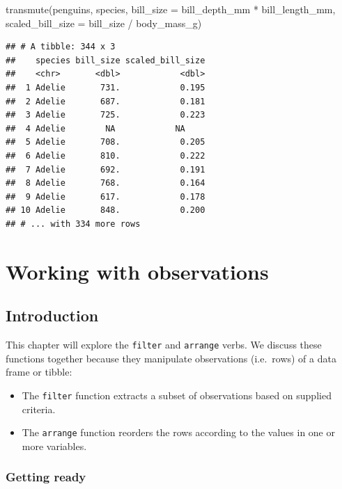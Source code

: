 \documentclass[
]{book}
\newenvironment{Shaded}{\begin{snugshade}}{\end{snugshade}}
\newcommand{\AttributeTok}[1]{\textcolor[rgb]{0.77,0.63,0.00}{#1}}
\newcommand{\FunctionTok}[1]{\textcolor[rgb]{0.00,0.00,0.00}{#1}}
\newcommand{\NormalTok}[1]{#1}
\newcommand{\SpecialCharTok}[1]{\textcolor[rgb]{0.00,0.00,0.00}{#1}}
\providecommand{\tightlist}{%
  \setlength{\itemsep}{0pt}\setlength{\parskip}{0pt}}
\begin{document}
\begin{Shaded}
\begin{Highlighting}[]
\FunctionTok{transmute}\NormalTok{(penguins,}
\NormalTok{          species,}
          \AttributeTok{bill\_size =}\NormalTok{ bill\_depth\_mm }\SpecialCharTok{*}\NormalTok{ bill\_length\_mm,}
          \AttributeTok{scaled\_bill\_size =}\NormalTok{ bill\_size }\SpecialCharTok{/}\NormalTok{ body\_mass\_g)}
\end{Highlighting}
\end{Shaded}

\begin{verbatim}
## # A tibble: 344 x 3
##    species bill_size scaled_bill_size
##    <chr>       <dbl>            <dbl>
##  1 Adelie       731.            0.195
##  2 Adelie       687.            0.181
##  3 Adelie       725.            0.223
##  4 Adelie        NA            NA    
##  5 Adelie       708.            0.205
##  6 Adelie       810.            0.222
##  7 Adelie       692.            0.191
##  8 Adelie       768.            0.164
##  9 Adelie       617.            0.178
## 10 Adelie       848.            0.200
## # ... with 334 more rows
\end{verbatim}

\hypertarget{working-with-observations}{%
\chapter{Working with observations}\label{working-with-observations}}

\hypertarget{introduction-4}{%
\section{Introduction}\label{introduction-4}}

This chapter will explore the \texttt{filter} and \texttt{arrange} verbs. We discuss these functions together because they manipulate observations (i.e.~rows) of a data frame or tibble:

\begin{itemize}
\tightlist
\item
  The \texttt{filter} function extracts a subset of observations based on supplied criteria.
\item
  The \texttt{arrange} function reorders the rows according to the values in one or more variables.
\end{itemize}

\hypertarget{getting-ready-1}{%
\subsection{Getting ready}\label{getting-ready-1}}
\end{document}
